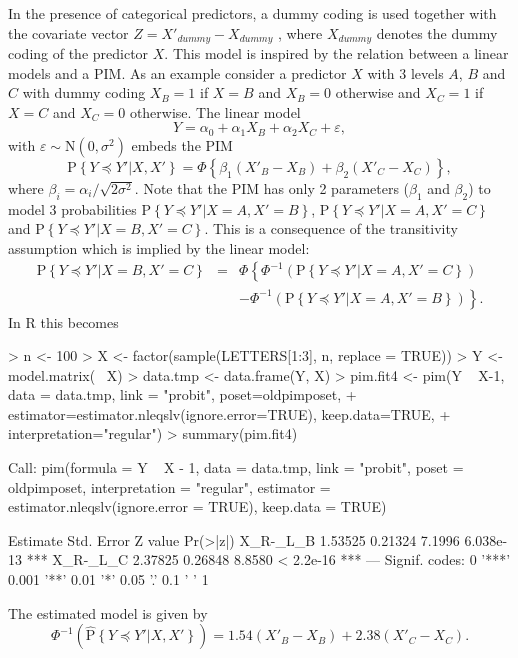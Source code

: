 \documentclass[12pt]{article}
\newcommand{\prob}[1]{\text{P}\left\{#1\right\}}
\newcommand{\hatprob}[1]{\hat{\text{P}}\left\{#1\right\}}
\newcommand{\leqs}{\preccurlyeq}
\begin{document}
In the presence of categorical predictors, a dummy coding is used together with the covariate vector $Z = X'_{dummy} - X_{dummy}$ , where $X_{dummy}$ denotes the dummy coding of the predictor $X$. This model is inspired by the relation between a linear models and a PIM. As an example consider a predictor $X$ with 3 levels $A$, $B$ and $C$ with dummy coding $X_{B} = 1$ if $X=B$ and $X_{B} = 0$ otherwise and $X_C = 1$ if $X = C$ and $X_C = 0$ otherwise. The linear model
\[
Y = \alpha_0 + \alpha_1 X_B + \alpha_2 X_C + \varepsilon,
\] 
with $\varepsilon \sim \text{N}(0,\sigma^2)$ embeds the PIM
\[
\prob{Y \leqs Y'| X, X'} = \Phi\left\{\beta_1 (X'_B - X_B) + \beta_2 (X'_C - X_C) \right\},
\]
where $\beta_i = \alpha_i/\sqrt{2 \sigma^2}$. Note that the PIM has only 2 parameters ($\beta_1$ and $\beta_2$) to model 3 probabilities $\prob{Y \leqs Y'| X = A, X' = B}$, $\prob{Y \leqs Y'| X = A, X' = C}$ and $\prob{Y \leqs Y'| X = B, X' = C}$. This is a consequence of the transitivity assumption which is implied by the linear model:
\begin{eqnarray*}
\prob{Y \leqs Y'| X = B, X' = C} &=& \Phi\left\{ \Phi^{-1} \left(\prob{Y \leqs Y'| X = A, X' = C} \right)  \right. \\
																 & & \left. 	- \Phi^{-1}\left(\prob{Y \leqs Y'| X = A, X' = B} \right) \right\}.
\end{eqnarray*}
In R this becomes
\begin{Schunk}
\begin{Sinput}
> n <- 100
> X <- factor(sample(LETTERS[1:3], n, replace = TRUE))
> Y <- model.matrix(~ X)%
> data.tmp <- data.frame(Y, X)
> pim.fit4 <- pim(Y ~ X-1, data = data.tmp, link = "probit", poset=oldpimposet, 
+   estimator=estimator.nleqslv(ignore.error=TRUE), keep.data=TRUE, 
+   interpretation="regular")
> summary(pim.fit4)
\end{Sinput}
\begin{Soutput}
Call:
pim(formula = Y ~ X - 1, data = data.tmp, link = "probit", poset = oldpimposet, 
    interpretation = "regular", estimator = estimator.nleqslv(ignore.error = TRUE), 
    keep.data = TRUE)

         Estimate Std. Error Z value  Pr(>|z|)    
X_R-_L_B  1.53525    0.21324  7.1996 6.038e-13 ***
X_R-_L_C  2.37825    0.26848  8.8580 < 2.2e-16 ***
---
Signif. codes:  0 '***' 0.001 '**' 0.01 '*' 0.05 '.' 0.1 ' ' 1 
\end{Soutput}
\end{Schunk}
The estimated model is given by
\[
\Phi^{-1}\left( \hatprob{Y \leqs Y'| X, X'} \right)= 1.54 (X'_B - X_B) + 2.38 (X'_C - X_C).
\]
\end{document}
